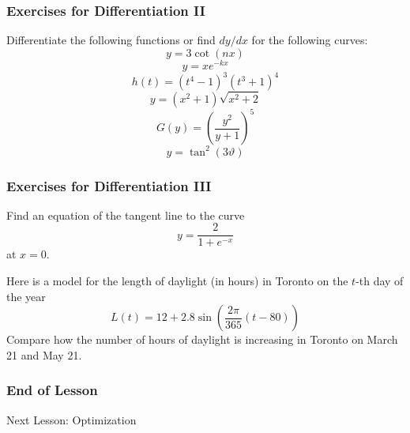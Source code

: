 \documentclass[xcolor=dvipsnames]{beamer}
\begin{document}
\begin{frame}
  \frametitle{Exercises for Differentiation II}
Differentiate the following functions or find $dy/dx$ for the
following curves:
\begin{equation}
  \label{eq:ciukaech}
  y=3\cot(nx)
\end{equation}
\begin{equation}
  \label{eq:oveagooy}
  y=xe^{-kx}
\end{equation}
\begin{equation}
  \label{eq:veeveema}
  h(t)=(t^{4}-1)^{3}(t^{3}+1)^{4}
\end{equation}
\begin{equation}
  \label{eq:athaazui}
  y=(x^{2}+1)\sqrt{x^{2}+2}
\end{equation}
\begin{equation}
  \label{eq:ahgoovim}
  G(y)=\left(\frac{y^{2}}{y+1}\right)^{5}
\end{equation}
\begin{equation}
  \label{eq:gaidaime}
  y=\tan^{2}(3\vartheta)
\end{equation}
\end{frame}

\begin{frame}
  \frametitle{Exercises for Differentiation III}
Find an equation of the tangent line to the curve
\begin{equation}
  \label{eq:vaixohga}
  y=\frac{2}{1+e^{-x}}
\end{equation}
at $x=0$.

\bigskip

Here is a model for the length of daylight (in hours) in Toronto on
the $t$-th day of the year
\begin{equation}
  \label{eq:iefeuvae}
  L(t)=12+2.8\sin\left(\frac{2\pi}{365}(t-80)\right)
\end{equation}
Compare how the number of hours of daylight is increasing in Toronto
on March 21 and May 21.
\end{frame}

\begin{frame}
  \frametitle{End of Lesson}
Next Lesson: Optimization
\end{frame}
\end{document}
